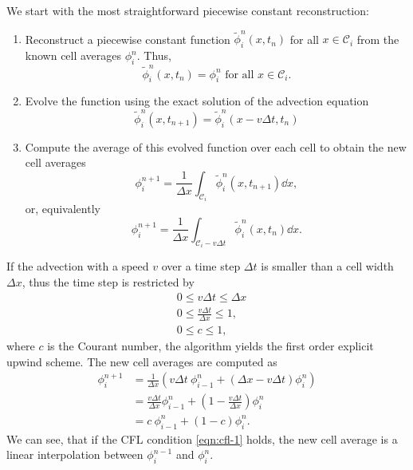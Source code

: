 \documentclass[../thesis.tex]{subfiles}
\begin{document}
We start with the most straightforward piecewise constant reconstruction:
\begin{enumerate}
    \item Reconstruct a piecewise constant function \(\tilde{\phi}_{i}^{n}(x,t_n)\) for all \(x \in \mathcal{C}_i\) from the known cell averages \(\phi_{i}^{n}\).
    Thus,
    \[
        \tilde{\phi}_{i}^{n}(x,t_n) = \phi_{i}^{n} \text{ for all } x \in \mathcal{C}_i.
    \]
    \item Evolve the function using the exact solution of the advection equation
    \[
        \tilde{\phi}_{i}^{n}(x,t_{n+1}) = \tilde{\phi}_{i}^{n}(x - v\Delta t,t_{n})
    \]
    \item Compute the average of this evolved function over each cell to obtain the new cell averages
    \[
        \phi_{i}^{n+1} =\frac{1}{\Delta x}\int_{\mathcal{C}_i}\tilde{\phi}_{i}^{n}(x,t_{n+1}) \dd{x},
    \]
    or, equivalently
    \[
        \phi_{i}^{n+1} =\frac{1}{\Delta x}\int_{\mathcal{C}_i-v\Delta t}\tilde{\phi}_{i}^{n}(x,t_{n}) \dd{x}.
    \]
\end{enumerate}
If the advection with a speed \(v\) over a time step \(\Delta t\) is smaller than a cell width \(\Delta x\), thus the time step is restricted by
\begin{equation}\label{eqn:cfl-1}
    \begin{split}
        &0 \leq v\Delta t \leq \Delta x
        \\
        &0 \leq \frac{v\Delta t}{\Delta x} \leq 1,
        \\
        &0 \leq c \leq 1,
    \end{split}
\end{equation}
where \(c\) is the Courant number, the algorithm yields the first order explicit upwind scheme. The new cell averages are computed as
\begin{equation}\label{eqn:explicit-upwind-1}
    \begin{split}
        \phi_{i}^{n+1} &=\frac{1}{\Delta x}\left(
            v\Delta t~\phi_{i-1}^{n} + \left( \Delta x - v\Delta t \right)\phi_{i}^{n}
        \right)
        \\
        &=\frac{v\Delta t}{\Delta x}\phi_{i-1}^{n}
        + \left( 1 - \frac{v\Delta t}{\Delta x} \right)\phi_{i}^{n}
        \\
        &= c~\phi_{i-1}^{n}
        + \left( 1 - c \right)\phi_{i}^{n}.
    \end{split}
\end{equation}
We can see, that if the CFL condition \eqref{eqn:cfl-1} holds, the new cell
average is a linear interpolation between \(\phi_{i}^{n-1}\) and \(\phi_{i}^{n}\).
\end{document}
